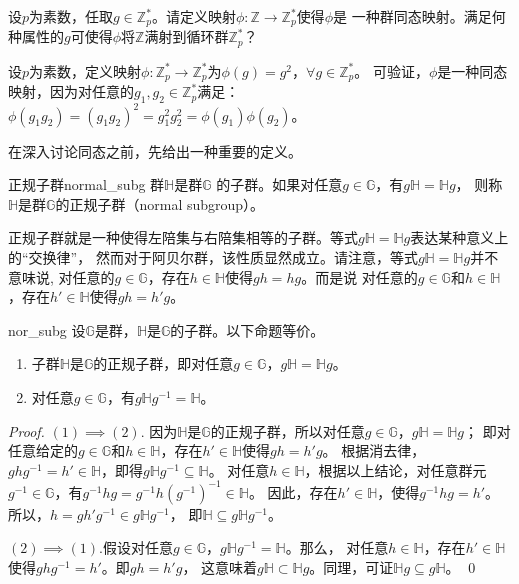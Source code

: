 \begin{example}
		设$p$为素数，任取$g\in \mathbb{Z}_p^*$。请定义映射$\phi\colon \mathbb{Z} \to \mathbb{Z}_p^*$使得$\phi$是
		一种群同态映射。满足何种属性的$g$可使得$\phi$将$\mathbb{Z}$满射到循环群$\mathbb{Z}_p^*$？%
\end{example}

\begin{example}
        设$p$为素数，定义映射$\phi\colon \mathbb{Z}_p^* \to \mathbb{Z}_p^*$为$\phi(g) = g^2$，$\forall g\in\mathbb{Z}_p^*$。
        可验证，$\phi$是一种同态映射，因为对任意的$g_1, g_2 \in \mathbb{Z}_p^*$满足：
        $\phi(g_1 g_2) = (g_1 g_2 )^2 =  g_1^2 g_2^2 = \phi(g_1) \phi(g_2)$。
\end{example}

在深入讨论同态之前，先给出一种重要的定义。
\begin{definition}{正规子群}{normal_subg}
		群$\mathbb{H}$是群$\mathbb{G}$ 的子群。如果对任意$g \in \mathbb{G}$，有$g\mathbb{H} = \mathbb{H}g$，
		则称$\mathbb{H}$是群$\mathbb{G}$的正规子群（normal subgroup）。
\end{definition}
正规子群就是一种使得左陪集与右陪集相等的子群。等式$g\mathbb{H} = \mathbb{H}g$表达某种意义上的“交换律”，
然而对于阿贝尔群，该性质显然成立。请注意，等式$g\mathbb{H} = \mathbb{H}g$并不意味说,
对任意的$g \in \mathbb{G}$，存在$h \in \mathbb{H}$使得$gh = hg $。而是说
对任意的$g \in \mathbb{G}$和$h \in \mathbb{H}$，存在$h' \in \mathbb{H}$使得$g h = h'g$。

\begin{proposition}{}{nor_subg}
设$\mathbb{G}$是群，$\mathbb{H}$是$\mathbb{G}$的子群。以下命题等价。
\begin{enumerate}
\item 子群$\mathbb{H}$是$\mathbb{G}$的正规子群，即对任意$g \in \mathbb{G}$，$g\mathbb{H} = \mathbb{H}g$。

\item 对任意$g \in \mathbb{G}$，有$g\mathbb{H}g^{-1} = \mathbb{H}$。
\end{enumerate}
\end{proposition}

\begin{proof}
$(1)  \implies (2).$ 因为$\mathbb{H}$是$\mathbb{G}$的正规子群，所以对任意$g \in \mathbb{G}$，$g\mathbb{H} = \mathbb{H}g$；
即对任意给定的$g\in \mathbb{G}$和$h \in \mathbb{H}$，存在$h' \in \mathbb{H}$使得$gh=h'g$。
根据消去律，$ghg^{-1} = h' \in \mathbb{H}$，即得$g\mathbb{H}g^{-1} \subseteq \mathbb{H}$。
对任意$h \in \mathbb{H}$，根据以上结论，对任意群元$g^{-1} \in \mathbb{G}$，有$g^{-1}hg = g^{-1}h(g^{-1})^{-1} \in \mathbb{H}$。
因此，存在$h' \in \mathbb{H}$，使得$g^{-1}hg = h'$。所以，$h = gh'g^{-1} \in g\mathbb{H}g^{-1}$，
即$\mathbb{H} \subseteq g\mathbb{H}g^{-1}$。

$(2) \implies (1).$假设对任意$g \in \mathbb{G}$，$g\mathbb{H}g^{-1} = \mathbb{H}$。那么，
对任意$h \in \mathbb{H}$，存在$h'\in \mathbb{H}$使得$ghg^{-1} = h'$。即$gh = h'g$，
这意味着$g\mathbb{H}\subset \mathbb{H}g$。同理，可证$\mathbb{H}g \subseteq g\mathbb{H}$。
\qed
\end{proof}

